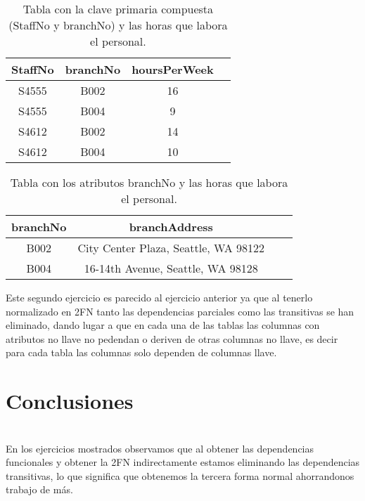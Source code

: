 \documentclass[spanish]{article}
\begin{document}
		\begin{table}[ht]
	    \centering
	    \begin{tabular}{|c|c|c|l|}
	    \hline
	    \rowcolor{green}
	    \textbf{StaffNo} & \textbf{branchNo} & \textbf{hoursPerWeek}\\ \hline
	        S4555 &  B002 & 16\\ \hline
	        S4555 &  B004 & 9\\ \hline
	        S4612 &  B002 & 14\\ \hline
	        S4612 &  B004 & 10\\ \hline
	    \end{tabular} 
	    \caption{Tabla con la clave primaria compuesta (StaffNo y branchNo) y las horas que labora el personal.}
	    \label{tab:Horas}
	\end{table}
	
	\newpage
			\begin{table}[ht]
	    \centering
	    \begin{tabular}{|c|c|c|l|}
	    \hline
	    \rowcolor{green}
	    \textbf{branchNo} & \textbf{branchAddress}\\ \hline
	       B002 & City Center Plaza, Seattle, WA 98122\\ \hline
	       B004 & 16-14th Avenue, Seattle, WA 98128\\ \hline
	    \end{tabular} 
	    \caption{Tabla con los atributos branchNo y las horas que labora el personal.}
	    \label{tab:Horas}
	\end{table}
	
	Este segundo ejercicio es parecido al ejercicio anterior ya que al tenerlo normalizado en 2FN tanto las dependencias parciales como las transitivas se han eliminado, dando lugar a que en cada una de las tablas las columnas con atributos no llave no pedendan o deriven de otras columnas no llave, es decir para cada tabla las columnas solo dependen de columnas llave.
	
	\section{Conclusiones}\\
	En los ejercicios mostrados observamos que al obtener las dependencias funcionales y obtener la 2FN indirectamente estamos eliminando las dependencias transitivas, lo que significa que obtenemos la tercera forma normal ahorrandonos trabajo de más.
	
\end{document}
